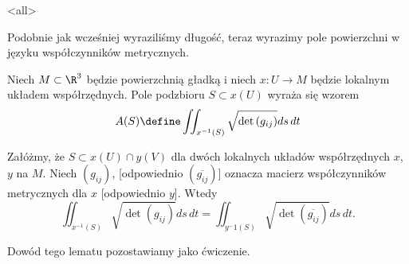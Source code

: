 \mode<all>{}
\begin{frame}

Podobnie jak wcześniej wyraziliśmy długość, teraz wyrazimy pole powierzchni w języku współczynników metrycznych.

\pause
\begin{definicja}\label{def:area-form}
Niech $M\subset \R^3$ będzie powierzchnią gładką i niech $x\colon U\to M$ będzie lokalnym układem współrzędnych. Pole podzbioru $S\subset x(U)$ wyraża się wzorem
\[A(S)\define\iint_{x^{-1}(S)}\sqrt{\det{(g_{ij})}}ds\,dt\]
\end{definicja}

\end{frame}
\begin{frame}[<+->]

\begin{lemat}
Załóżmy, że $S\subset x(U)\cap y(V)$ dla dwóch lokalnych układów współrzędnych $x$, $y$ na $M$. Niech $(g_{ij})$, [odpowiednio $(\overline{g_{ij}})$] oznacza macierz współczynników metrycznych dla $x$ [odpowiednio $y$]. Wtedy
\[\iint_{x^{-1}(S)}\sqrt{\det{(g_{ij})}}ds\,dt=\iint_{y^-1(S)}\sqrt{\det{(\overline{g_{ij}})}}ds\,dt.\]
\end{lemat}

\pause Dowód tego lematu pozostawiamy jako ćwiczenie.
\end{frame}
